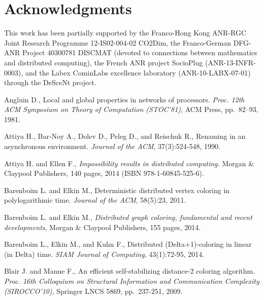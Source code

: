 \documentclass[11pt,english]{article}
\begin{document}
\section*{Acknowledgments}
This work has been partially supported by the Franco-Hong Kong ANR-RGC
Joint Research Programme 12-IS02-004-02 CO2Dim, the Franco-German
DFG-ANR Project 40300781 DISCMAT (devoted to connections between
mathematics and distributed computing), the French ANR project
SocioPlug (ANR-13-INFR-0003), and the Labex CominLabs excellence
laboratory (ANR-10-LABX-07-01) through the DeSceNt project.  






\begin{thebibliography}{99}
\footnotesize{

\vspace{-0.1cm}
Angluin D.,
Local and global properties in networks of processors.
{\it  Proc. 12th ACM Symposium on Theory of Computation (STOC'81)}, ACM Press,
pp.~82--93, 1981.


\vspace{-0.1cm}
Attiya H., Bar-Noy A., Dolev D., Peleg D., and Reischuk R., 
Renaming in an asynchronous environment.
{\it Journal of the ACM}, 37(3):524-548, 1990. 

\vspace{-0.1cm}
Attiya H. and Ellen F., 
{\it Impossibility results in distributed computing.}
Morgan \& Claypool Publishers,  140  pages, 2014
(ISBN 978-1-60845-525-6). 


\vspace{-0.1cm}
Barenboim L. and  Elkin M.,
Deterministic distributed vertex coloring in polylogarithmic time. 
{\it Journal of the ACM},  58(5):23, 2011.

\vspace{-0.1cm}
Barenboim L. and  Elkin M.,
{\it Distributed graph coloring, fundamental and recent developments}, 
Morgan \& Claypool Publishers,  155 pages, 2014. 

\vspace{-0.1cm}
Barenboim L.,  Elkin M., and  Kuhn F., 
Distributed (Delta+1)-coloring in linear (in Delta) time. 
{\it SIAM Journal of  Computing},  43(1):72-95, 2014. 


\vspace{-0.1cm}
Blair J. and Manne F.,
An efficient self-stabilizing distance-2 coloring algorithm.
{\it Proc.  16th  Colloquium on  Structural Information and Communication
Complexity  (SIROCCO'10)},  Springer LNCS 5869, pp.~237-251, 2009.


}
\end{thebibliography}
\end{document}
